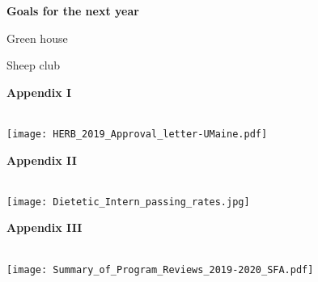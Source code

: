 \documentclass[11pt]{article}
\begin{document}
\textbf{Goals for the next year}
\begin{description}[topsep=11pt, noitemsep]
\item[\textbf{1:}] Green house
\item[\textbf{2:}] %
\item[\textbf{3:}] Sheep club
\item[\textbf{4:}] %
\end{description}
\newpage
\textbf{Appendix I}\\~\\
\begin{turn}{0}
\texttt{[image: HERB\_2019\_Approval\_letter-UMaine.pdf]}
\end{turn}
\newpage
\textbf{Appendix II}\\~\\
\begin{turn}{0}
\texttt{[image: Dietetic\_Intern\_passing\_rates.jpg]}
\end{turn}
\newpage
\textbf{Appendix III}\\~\\
\begin{turn}{0}
\texttt{[image: Summary\_of\_Program\_Reviews\_2019-2020\_SFA.pdf]}
\end{turn}
\end{document}
